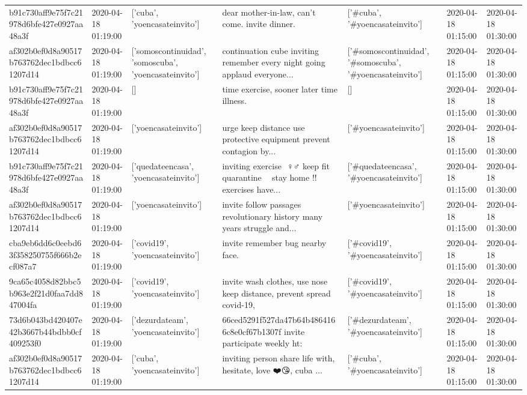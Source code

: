 \begin{tabular}{lllllll}
b91c730aff9e75f7c21978d6bfe427e0927aa48a3f & 2020-04-18 01:19:00 & ['cuba', 'yoencasateinvito'] & dear mother-in-law, can't come. invite dinner. & ['#cuba', '#yoencasateinvito'] & 2020-04-18 01:15:00 & 2020-04-18 01:30:00 \\
af302b0ef0d8a90517b763762dec1bdbcc61207d14 & 2020-04-18 01:19:00 & ['somoscontinuidad', 'somoscuba', 'yoencasateinvito'] & continuation cube inviting remember every night going applaud everyone... & ['#somoscontinuidad', '#somoscuba', '#yoencasateinvito'] & 2020-04-18 01:15:00 & 2020-04-18 01:30:00 \\
b91c730aff9e75f7c21978d6bfe427e0927aa48a3f & 2020-04-18 01:19:00 & [] & time exercise, sooner later time illness. & [] & 2020-04-18 01:15:00 & 2020-04-18 01:30:00 \\
af302b0ef0d8a90517b763762dec1bdbcc61207d14 & 2020-04-18 01:19:00 & ['yoencasateinvito'] & urge keep distance use protective equipment prevent contagion by... & ['#yoencasateinvito'] & 2020-04-18 01:15:00 & 2020-04-18 01:30:00 \\
b91c730aff9e75f7c21978d6bfe427e0927aa48a3f & 2020-04-18 01:19:00 & ['quedateencasa', 'yoencasateinvito'] & inviting exercise ️ ♀️♂️ keep fit quarantine 💪💪 stay home !!️ exercises have... & ['#quedateencasa', '#yoencasateinvito'] & 2020-04-18 01:15:00 & 2020-04-18 01:30:00 \\
af302b0ef0d8a90517b763762dec1bdbcc61207d14 & 2020-04-18 01:19:00 & ['yoencasateinvito'] & invite follow passages revolutionary history many years struggle and... & ['#yoencasateinvito'] & 2020-04-18 01:15:00 & 2020-04-18 01:30:00 \\
cba9eb6dd6c0eebd63f358250755f666b2ecf087a7 & 2020-04-18 01:19:00 & ['covid19', 'yoencasateinvito'] & invite remember bug nearby face. & ['#covid19', '#yoencasateinvito'] & 2020-04-18 01:15:00 & 2020-04-18 01:30:00 \\
9ca65c4058d82bbc5b963e2f21d0faa7dd847004fa & 2020-04-18 01:19:00 & ['covid19', 'yoencasateinvito'] & invite wash clothes, use nose keep distance, prevent spread covid-19, & ['#covid19', '#yoencasateinvito'] & 2020-04-18 01:15:00 & 2020-04-18 01:30:00 \\
73d6b043bd420407e42b3667b44bdbb0cf409253f0 & 2020-04-18 01:19:00 & ['dezurdateam', 'yoencasateinvito'] & 66ced5291f527da47b64b4864166c8e0cf67b1307f invite participate weekly ht: & ['#dezurdateam', '#yoencasateinvito'] & 2020-04-18 01:15:00 & 2020-04-18 01:30:00 \\
af302b0ef0d8a90517b763762dec1bdbcc61207d14 & 2020-04-18 01:19:00 & ['cuba', 'yoencasateinvito'] & inviting person share life with, hesitate, love ❤️😘, cuba ... & ['#cuba', '#yoencasateinvito'] & 2020-04-18 01:15:00 & 2020-04-18 01:30:00 \\

\end{tabular}
